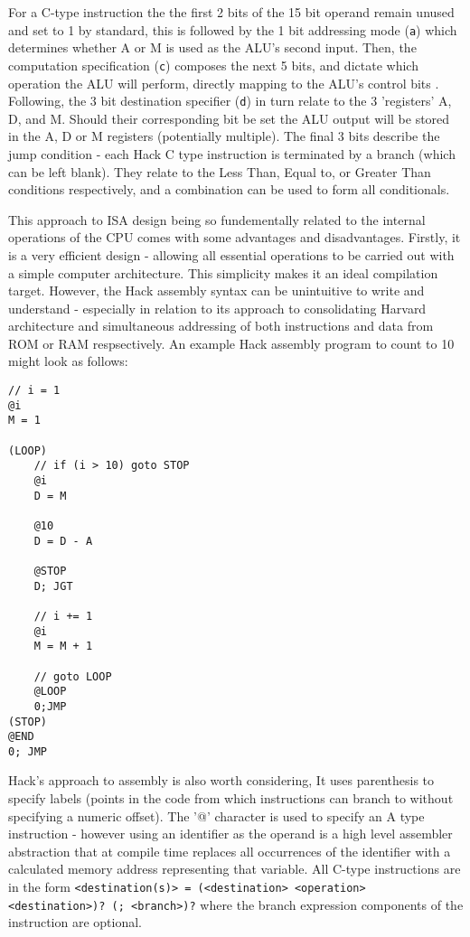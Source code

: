 For a C-type instruction the the first 2 bits of the 15 bit operand remain unused and set to 1 by standard, this is followed by the 1 bit addressing mode (\texttt{a}) which determines whether A or M is used as the ALU's second input. Then, the computation specification (\texttt{c}) composes the next 5 bits, and dictate which operation the ALU will perform, directly mapping to the ALU's control bits \textcite{EOCS}. Following, the 3 bit destination specifier (\texttt{d}) in turn relate to the 3 'registers' A, D, and M. Should their corresponding bit be set the ALU output will be stored in the A, D or M registers (potentially multiple). The final 3 bits describe the jump condition - each Hack C type instruction is terminated by a branch (which can be left blank). They relate to the Less Than, Equal to, or Greater Than conditions respectively, and a combination can be used to form all conditionals.

\bigskip


\bigskip

This approach to ISA design being so fundementally related to the internal operations of the CPU comes with some advantages and disadvantages. Firstly, it is a very efficient design - allowing all essential operations to be carried out with a simple computer architecture. This simplicity makes it an ideal compilation target. However, the Hack assembly syntax can be unintuitive to write and understand - especially in relation to its approach to consolidating Harvard architecture and simultaneous addressing of both instructions and data from ROM or RAM respsectively. An example Hack assembly program to count to 10 might look as follows:
\begin{lstlisting}
// i = 1
@i
M = 1

(LOOP)
    // if (i > 10) goto STOP
    @i 
    D = M

    @10
    D = D - A

    @STOP
    D; JGT

    // i += 1
    @i
    M = M + 1

    // goto LOOP
    @LOOP
    0;JMP
(STOP)
@END
0; JMP
\end{lstlisting}

Hack's approach to assembly is also worth considering, It uses parenthesis to specify labels (points in the code from which instructions can branch to without specifying a numeric offset). The '@' character is used to specify an A type instruction - however using an identifier as the operand is a high level assembler abstraction that at compile time replaces all occurrences of the identifier with a calculated memory address representing that variable. All C-type instructions are in the form \texttt{<destination(s)> = (<destination> <operation> <destination>)? (; <branch>)?} where the branch expression components of the instruction are optional. 

